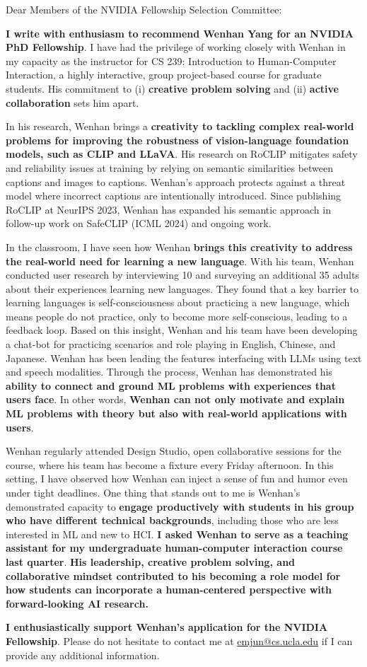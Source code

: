 Dear Members of the NVIDIA Fellowship Selection Committee:

\textbf{I write with enthusiasm to recommend Wenhan Yang for an NVIDIA PhD
Fellowship}. I have had the privilege of working closely with Wenhan in my
capacity as the instructor for CS 239: Introduction to Human-Computer
Interaction, a highly interactive, group project-based course for graduate
students. His commitment to (i) \textbf{creative problem solving} and
(ii) \textbf{active collaboration} sets him apart.

In his research, Wenhan brings a \textbf{creativity to tackling complex real-world
problems for improving the robustness of vision-language foundation models, such
as CLIP and LLaVA}. His research on RoCLIP mitigates safety and reliability
issues at training by relying on semantic similarities between captions and
images to captions. Wenhan's approach protects against a threat model where
incorrect captions are intentionally introduced. Since publishing RoCLIP at
NeurIPS 2023, Wenhan has expanded his semantic approach in follow-up
work on SafeCLIP (ICML 2024) and ongoing work. 

In the classroom, I have seen how Wenhan \textbf{brings this creativity to
address the real-world need for learning a new language}. With his team, Wenhan
conducted user research by interviewing 10 and surveying an additional 35 adults
about their experiences learning new languages. They found that a key barrier to
learning languages is self-consciousness about practicing a new language, which
means people do not practice, only to become more self-conscious, leading to a
feedback loop. Based on this insight, Wenhan and his team have been developing a
chat-bot for practicing scenarios and role playing in English, Chinese, and
Japanese. Wenhan has been leading the features interfacing with LLMs using text
and speech modalities. Through the process, Wenhan has demonstrated his
\textbf{ability to connect and ground ML problems with experiences that users
face}. In other words, \textbf{Wenhan can not only motivate and explain ML
problems with theory but also with real-world applications with users}.

Wenhan regularly attended Design Studio, open collaborative sessions for the
course, where his team has become a fixture every Friday afternoon. In this
setting, I have observed how Wenhan can inject a sense of fun and humor even
under tight deadlines. One thing that stands out to me is Wenhan's demonstrated
capacity to \textbf{engage productively with students in his group who have different technical backgrounds},
including those who are less interested in ML and new to HCI. 
\textbf{I asked Wenhan to serve as a teaching assistant for my
undergraduate human-computer interaction course last quarter}. \textbf{His leadership, creative problem solving, and collaborative
mindset contributed to his becoming a role model for how students can incorporate a human-centered perspective with forward-looking AI research.}

\textbf{I
enthusiastically support Wenhan's application for the NVIDIA Fellowship}. 
Please do not hesitate to contact me at \href{mailto:emjun@cs.ucla.edu}{emjun@cs.ucla.edu} if I can provide any additional information.
